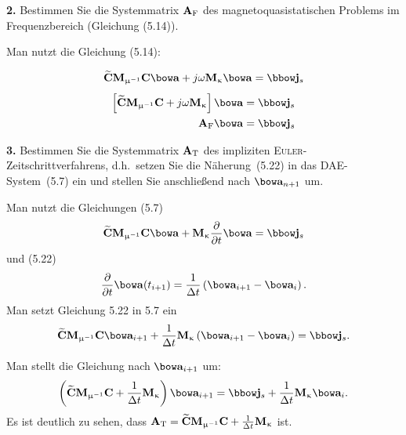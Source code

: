 \documentclass[Protokollheft.tex]{subfiles}
\begin{document}
\begin{framed}
	\noindent \textbf{2.} Bestimmen Sie die Systemmatrix $ \mathbf{A} _\text{F}$ des magnetoquasistatischen Problems im Frequenzbereich (Gleichung (5.14)).\label{exer:systemMatMQSF}
\end{framed}

Man nutzt die Gleichung (5.14):

$$ \curldfit\Mmui\curlfit\afit + j \omega\Mkap\afit = \jfit_{\boldmath{s}} $$
\begin{eqnarray}
\left[ \curldfit\Mmui\curlfit + j \omega\Mkap \right]\afit = \jfit_{\boldmath{s}} \\
\Amat_\text{F}\afit=\jfit_{\boldmath{s}}
 \end{eqnarray}
\begin{framed}
	\noindent \textbf{3.} Bestimmen Sie die Systemmatrix $ \mathbf{A} _\text{T}$ des impliziten
      \textsc{Euler}-Zeitschrittverfahrens, d.h.\ setzen Sie die Näherung~(5.22) in das DAE-System~(5.7) ein und stellen Sie anschließend nach $\afit_{n+1}$ um.\label{exer:systemMatMQST}
\end{framed}
Man nutzt die Gleichungen (5.7)
$$ \curldfit\Mmui\curlfit\afit +           \Mkap      \frac{\partial }{\partial t}\afit = \jfit_{\boldmath{s}} $$
und (5.22)
$$ \frac{\partial }{\partial t}\afit(t_{i+1})=\frac{1}{\Delta t}\left(\afit_{i+1} - \afit_i\right).$$
Man setzt  Gleichung 5.22 in 5.7 ein
$$ \curldfit\Mmui\curlfit\afit_{i+1}+\frac{1}{\Delta t}\Mkap\left(\afit_{i+1} - \afit_i\right)= \jfit_{\boldmath{s}}. $$

Man stellt die Gleichung nach $\afit_{i+1}$ um:
$$ \left(\curldfit\Mmui\curlfit+\frac{1}{\Delta t}\Mkap\right)\afit_{i+1}= \jfit_{\boldmath{s}}+\frac{1}{\Delta t}\Mkap\afit_i. $$
Es ist deutlich zu sehen, dass $ \mathbf{A} _\text{T} =\widetilde{\mathbf{C}}\mathbf{M}_{\upmu^{-1}}\mathbf{C}+\frac{1}{\Delta t}\mathbf{M}_{\upkappa} $ ist.
\end{document}
